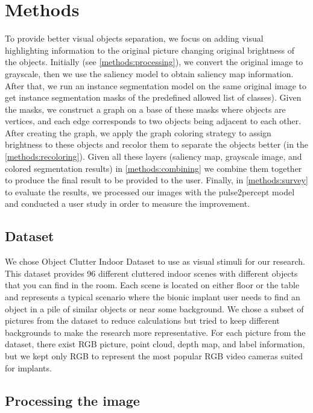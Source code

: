 \section{Methods}
\label{methods:general}

To provide better visual objects separation, we focus on adding visual highlighting information to the original picture
changing original brightness of the objects. Initially (see \autoref{methods:processing}), we convert the original image to grayscale, then we use the saliency model to obtain saliency map information. After that, we run an instance segmentation model on the same original image to get instance segmentation masks of the predefined allowed list of classes). Given the masks, we construct a graph on a base of these masks where objects are vertices, and each edge corresponds to two objects being adjacent to each other. After creating the graph, we apply the graph coloring strategy to assign brightness to these objects and recolor them to separate the objects better (in the \autoref{methods:recoloring}). Given all these layers (saliency map, grayscale image, and colored segmentation results) in \autoref{methods:combining} we combine them together to produce the final result to be provided to the user. Finally, in {\autoref{methods:survey}} to evaluate the results, we processed our images with the pulse2percept model and conducted a user study in order to measure the improvement.

\subsection{Dataset}
\label{methods:dataset}

We chose Object Clutter Indoor Dataset \cite{ociddataset} to use as visual stimuli for our research.
This dataset provides 96 different cluttered indoor scenes with different objects that you can find in the room. 
Each scene is located on either floor or the table and represents a typical scenario where the bionic implant user needs to find an object in a pile of similar objects or near some background. We chose a subset of pictures from the dataset to reduce calculations but tried to keep different backgrounds to make the research more representative.
For each picture from the dataset, there exist RGB picture, point cloud, depth map, and label information, but we kept only RGB to represent the most popular RGB video cameras suited for implants.

\subsection{Processing the image}
\label{methods:processing}

